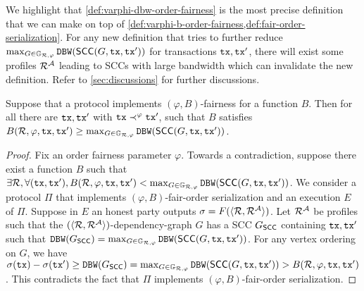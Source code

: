 

We highlight that \cref{def:varphi-dbw-order-fairness} is the most precise definition that we can make on top of \cref{def:varphi-b-order-fairness,def:fair-order-serialization}.
%
For any new definition that tries to further reduce $\max_{G \in \mathbb{G}_{\mathcal{R}, \varphi}} \mathtt{DBW}(\mathsf{SCC}(G, \mathtt{tx}, \mathtt{tx}'))$ for transactions $\mathtt{tx}, \mathtt{tx}'$, there will exist some profiles $\mathcal{R}^\mathcal{A}$ leading to SCCs with large bandwidth which can invalidate the new definition.
%
Refer to \cref{sec:discussions} for further discussions.

\begin{theorem} \label{thm:best-fairness}
    Suppose that a protocol implements $(\varphi, B)$-fairness for a function $B$.
    Then for all \profileSet there are $\mathtt{tx},\mathtt{tx}'$ with $\mathtt{tx} \prec^\varphi \mathtt{tx}'$,  such that $B$ satisfies
    \( B(\mathcal{R}, \varphi, \mathtt{tx}, \mathtt{tx}') \allowbreak \geq \max_{G \in \mathbb{G}_{\mathcal{R}, \varphi}} \mathtt{DBW} (\mathsf{SCC}(G, \mathtt{tx}, \mathtt{tx}')) \).
\end{theorem}

\begin{proof}
    Fix an order fairness parameter $\varphi$.
    Towards a contradiction, suppose there exist a function $B$ such that $\exists \mathcal{R}, \forall(\mathtt{tx}, \mathtt{tx}'), B(\mathcal{R}, \varphi, \allowbreak \mathtt{tx}, \mathtt{tx}') < \max_{G \in \mathbb{G}_{\mathcal{R}, \varphi}} \allowbreak \mathtt{DBW} (\mathsf{SCC}(G, \mathtt{tx}, \mathtt{tx}'))$.
    We consider a protocol $\Pi$ that implements $(\varphi, B)$-fair-order serialization and an execution $E$ of $\Pi$.
    Suppose in $E$ an honest party outputs $\sigma = F(\langle \mathcal{R}, \mathcal{R}^\mathcal{A} \rangle)$.
    Let $\mathcal{R}^\mathcal{A}$ be profiles such that the $(\langle \mathcal{R}, \mathcal{R}^\mathcal{A} \rangle)$-dependency-graph $G$ has a SCC $G_\mathsf{SCC}$ containing $\mathtt{tx}, \mathtt{tx}'$ such that $\mathtt{DBW}(G_\mathsf{SCC}) = \max_{G \in \mathbb{G}_{\mathcal{R}, \varphi}} \allowbreak \mathtt{DBW} (\mathsf{SCC}(G, \mathtt{tx}, \mathtt{tx}'))$.
    For any vertex ordering \orderOutput on $G$, we have $\sigma(\mathtt{tx}) - \sigma(\mathtt{tx}') \ge \mathtt{DBW}(G_\mathsf{SCC}) = \max_{G \in \mathbb{G}_{\mathcal{R}, \varphi}} \mathtt{DBW} (\mathsf{SCC}(G, \mathtt{tx}, \mathtt{tx}')) > B(\mathcal{R}, \varphi, \mathtt{tx}, \mathtt{tx}')$.
    This contradicts the fact that $\Pi$ implements $(\varphi, B)$-fair-order serialization.
\end{proof}

